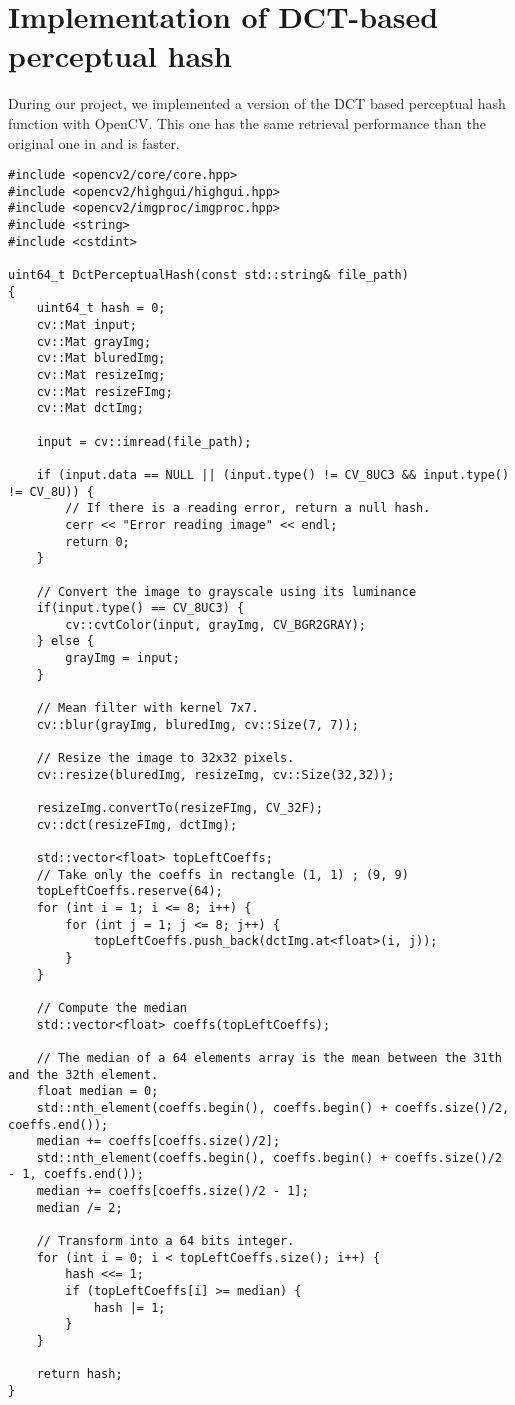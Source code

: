 \chapter{Implementation of DCT-based perceptual hash}

\label{chapter:ImplementationDCTPerceptualHash}


During our project, we implemented a version of the DCT based perceptual hash function with OpenCV. This one has the same retrieval performance than the original one in \cite{zauner2010implementation} and is faster.

\begin{lstlisting}
#include <opencv2/core/core.hpp>
#include <opencv2/highgui/highgui.hpp>
#include <opencv2/imgproc/imgproc.hpp>
#include <string>
#include <cstdint>

uint64_t DctPerceptualHash(const std::string& file_path)
{
    uint64_t hash = 0;
    cv::Mat input;
    cv::Mat grayImg;
    cv::Mat bluredImg;
    cv::Mat resizeImg;
    cv::Mat resizeFImg;
    cv::Mat dctImg;

    input = cv::imread(file_path);

    if (input.data == NULL || (input.type() != CV_8UC3 && input.type() != CV_8U)) {
        // If there is a reading error, return a null hash.
        cerr << "Error reading image" << endl;
        return 0;
    }

    // Convert the image to grayscale using its luminance
    if(input.type() == CV_8UC3) {
        cv::cvtColor(input, grayImg, CV_BGR2GRAY);
    } else {
        grayImg = input;
    }

    // Mean filter with kernel 7x7.
    cv::blur(grayImg, bluredImg, cv::Size(7, 7));

    // Resize the image to 32x32 pixels.
    cv::resize(bluredImg, resizeImg, cv::Size(32,32));

    resizeImg.convertTo(resizeFImg, CV_32F);
    cv::dct(resizeFImg, dctImg);

    std::vector<float> topLeftCoeffs;
    // Take only the coeffs in rectangle (1, 1) ; (9, 9)
    topLeftCoeffs.reserve(64);
    for (int i = 1; i <= 8; i++) {
        for (int j = 1; j <= 8; j++) {
            topLeftCoeffs.push_back(dctImg.at<float>(i, j));
        }
    }

    // Compute the median
    std::vector<float> coeffs(topLeftCoeffs);

    // The median of a 64 elements array is the mean between the 31th and the 32th element.
    float median = 0;
    std::nth_element(coeffs.begin(), coeffs.begin() + coeffs.size()/2, coeffs.end());
    median += coeffs[coeffs.size()/2];
    std::nth_element(coeffs.begin(), coeffs.begin() + coeffs.size()/2 - 1, coeffs.end());
    median += coeffs[coeffs.size()/2 - 1];
    median /= 2;

    // Transform into a 64 bits integer.
    for (int i = 0; i < topLeftCoeffs.size(); i++) {
        hash <<= 1;
        if (topLeftCoeffs[i] >= median) {
            hash |= 1;
        }
    }

    return hash;
}
\end{lstlisting}